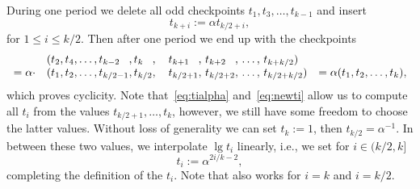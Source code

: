 During one period we delete all odd checkpoints $t_1,t_3,\ldots,t_{k-1}$ and insert
\begin{equation} \label{eq:newti}
  t_{k+i} := \alpha t_{k/2+i},
\end{equation}
for $1 \le i \le k/2$. Then after one period we end up with the checkpoints
\[
\begin{array}{l*{5}{l@{,\,}}@{\quad}*{3}{l@{,\ }}ll}
  &(t_2 & t_4 & \ldots\, & t_{k-2} & t_k & t_{k+1} & t_{k+2} &\ldots\, & t_{k+k/2})&  \\
  = \alpha \cdot&(t_1 & t_2 & \ldots\, & t_{k/2-1} &t_{k/2} & t_{k/2+1} & t_{k/2+2} & \ldots\, &t_{k/2+k/2})& = \alpha (t_1,t_2,\ldots,t_k),
\end{array}
\]
which proves cyclicity. Note that~\eqref{eq:tialpha} and~\eqref{eq:newti} allow us to compute all $t_i$ from the values $t_{k/2+1},\ldots,t_k$, however, we still have some freedom to choose the latter values. Without loss of generality we can set $t_k := 1$, then $t_{k/2} = \alpha^{-1}$. In between these two values, we interpolate $\lg t_i$ linearly, i.e., we set for $i \in (k/2,k]$
\begin{equation} \label{eq:tiinterpol}
  t_i := \alpha^{2i/k - 2},
\end{equation}
completing the definition of the $t_i$. Note that\SV{\eqref{eq:tiinterpol}} also works for $i=k$ and $i=k/2$.

